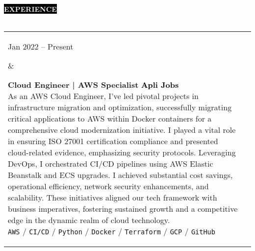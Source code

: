 \documentclass[10pt,A4]{article}
\makeatletter
\newcounter{a}
\newcounter{b}
\newcounter{c}
\newcommand{\cvsection}[1] {
	\textcolor{white}{\MakeUppercase{\textbf{#1}}}
}
\newcommand{\cvsect}[1]{
	\colorbox{black}{{\cvsection{#1}}}\\\\%
}
\newenvironment{entrylist}{%
	\begin{tabular*}{\textwidth}[t]{@{\extracolsep{\fill}}ll}
	}{%
	\end{tabular*}
}
\newcommand{\entry}[4]{%
	\parbox[t]{3.5cm}{%
		#1%
	}%
	&\parbox[t]{14cm}{%
		\textbf{#2}%
		\hfill%
		{\footnotesize \textbf{\textcolor{black}{#3}}}\\%
		#4%
	}\\\\}
\newcommand{\slashsep}{
	\hspace{2mm}/\hspace{2mm}
}
\makeatother
\begin{document}
	
	\cvsect{Experience}
	\begin{entrylist}
		\entry
		{Jan 2022 – Present}
		{Cloud Engineer | AWS Specialist}
		{Apli Jobs}
		{As an AWS Cloud Engineer, I've led pivotal projects in infrastructure
		migration and optimization, successfully migrating critical applications to AWS
		within Docker containers for a comprehensive cloud modernization initiative. I
		played a vital role in ensuring ISO 27001 certification compliance and presented
		cloud-related evidence, emphasizing security protocols.
		\hfil\break
		Leveraging DevOps, I orchestrated CI/CD pipelines using AWS Elastic Beanstalk and
		ECS upgrades. I achieved substantial cost savings, operational efficiency, network
		security enhancements, and scalability. These initiatives aligned our tech framework
		with business imperatives, fostering sustained growth and a competitive edge in the
		dynamic realm of cloud technology.\\
			\texttt{AWS}\slashsep\texttt{CI/CD}\slashsep\texttt{Python}\slashsep\texttt{Docker}\slashsep\texttt{Terraform}\slashsep\texttt{GCP}\slashsep\texttt{GitHub}}
		\entry
		{Feb 2021 – Jan 2022}
		{Backend Developer + AWS Cloud Engineer}
		{Galaxy Technology}
		{As a Backend Engineer and Team Lead, I crafted REST APIs and oversaw database
		managementusing Node.js with Express and Sequelize. My role extended to hosting
		essential services within AWS, employing tools like Lambda, API Gateway,
		AppSync, DynamoDB, SNS, and SQS. Collaborating closely with customers, I addressed
		change requests and implemented new functionalities, enhancing our services to
		meet evolving needs.\\
			\texttt{Node.js}\slashsep\texttt{Express}\slashsep\texttt{Sequelize}\slashsep\texttt{AWS}\slashsep\texttt{GraphQL}}
		\entry
		{April 2020 – Oct 2020}
		{Junior React Native Developer}
		{Cubo Rojo}
		{As a Full-stack Developer, I led the development of a React Native app integrated
		with Firebase, featuring a non-relational database and serving as a robust user
		authentication handler. This application revolutionized the company's workflow by
		automating user requests and computer configuration processes. The impactful result
		was a significant reduction in response time, transitioning from 30 minutes to
		real-time interactions.\\
			\texttt{React Native}\slashsep\texttt{Node.js}\slashsep\texttt{Python}\slashsep\texttt{Ubuntu Server}\slashsep\texttt{Firebase}}
	\end{entrylist}
	\\\\
\end{document}
